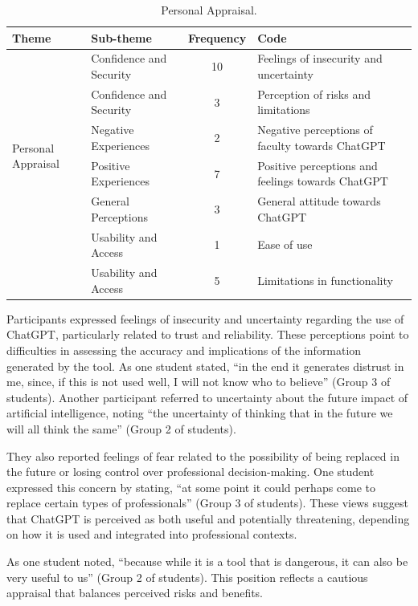 \documentclass[english]{textolivre}
\begin{document}
\begin{table}[h!]
\centering
\begin{threeparttable}
\caption{Personal Appraisal.}
\label{tab3}
\begin{tabular}{p{3cm}p{}c p{5cm}}
\toprule
Theme & Sub-theme & Frequency & Code \\
\midrule
\multirow{6}{*}{Personal Appraisal}
& Confidence and Security & 10 & Feelings of insecurity and uncertainty \\
& Confidence and Security & 3 & Perception of risks and limitations \\
& Negative Experiences & 2 & Negative perceptions of faculty towards ChatGPT \\
& Positive Experiences & 7 & Positive perceptions and feelings towards ChatGPT \\
& General Perceptions & 3 & General attitude towards ChatGPT \\
& Usability and Access & 1 & Ease of use \\
& Usability and Access & 5 & Limitations in functionality \\
\bottomrule
\end{tabular}
\end{threeparttable}
\end{table}

Participants expressed feelings of insecurity and uncertainty regarding the use of ChatGPT, particularly related to trust and reliability. These perceptions point to difficulties in assessing the accuracy and implications of the information generated by the tool. As one student stated, “in the end it generates distrust in me, since, if this is not used well, I will not know who to believe” (Group 3 of students). Another participant referred to uncertainty about the future impact of artificial intelligence, noting “the uncertainty of thinking that in the future we will all think the same” (Group 2 of students).

They also reported feelings of fear related to the possibility of being replaced in the future or losing control over professional decision-making. One student expressed this concern by stating, “at some point it could perhaps come to replace certain types of professionals” (Group 3 of students). These views suggest that ChatGPT is perceived as both useful and potentially threatening, depending on how it is used and integrated into professional contexts.

As one student noted, “because while it is a tool that is dangerous, it can also be very useful to us” (Group 2 of students). This position reflects a cautious appraisal that balances perceived risks and benefits.
\end{document}
